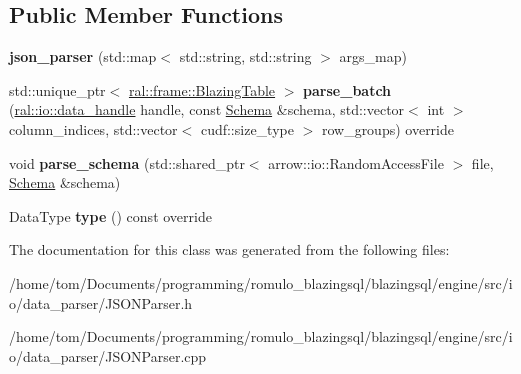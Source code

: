 \subsection*{Public Member Functions}
\begin{DoxyCompactItemize}
\item 
\mbox{\label{classral_1_1io_1_1json__parser_aef9ce5caa2fd1086e3d5aa6dfe723f4d}} 
{\bfseries json\+\_\+parser} (std\+::map$<$ std\+::string, std\+::string $>$ args\+\_\+map)
\item 
\mbox{\label{classral_1_1io_1_1json__parser_a992383cf7446818b506cabdbc96bb770}} 
std\+::unique\+\_\+ptr$<$ \hyperlink{classral_1_1frame_1_1BlazingTable}{ral\+::frame\+::\+Blazing\+Table} $>$ {\bfseries parse\+\_\+batch} (\hyperlink{structral_1_1io_1_1data__handle}{ral\+::io\+::data\+\_\+handle} handle, const \hyperlink{classral_1_1io_1_1Schema}{Schema} \&schema, std\+::vector$<$ int $>$ column\+\_\+indices, std\+::vector$<$ cudf\+::size\+\_\+type $>$ row\+\_\+groups) override
\item 
\mbox{\label{classral_1_1io_1_1json__parser_aff4871574deac794565c9eea47614243}} 
void {\bfseries parse\+\_\+schema} (std\+::shared\+\_\+ptr$<$ arrow\+::io\+::\+Random\+Access\+File $>$ file, \hyperlink{classral_1_1io_1_1Schema}{Schema} \&schema)
\item 
\mbox{\label{classral_1_1io_1_1json__parser_a7dfd06541866d0872bbce8381cb65769}} 
Data\+Type {\bfseries type} () const override
\end{DoxyCompactItemize}


The documentation for this class was generated from the following files\+:\begin{DoxyCompactItemize}
\item 
/home/tom/\+Documents/programming/romulo\+\_\+blazingsql/blazingsql/engine/src/io/data\+\_\+parser/J\+S\+O\+N\+Parser.\+h\item 
/home/tom/\+Documents/programming/romulo\+\_\+blazingsql/blazingsql/engine/src/io/data\+\_\+parser/J\+S\+O\+N\+Parser.\+cpp\end{DoxyCompactItemize}
